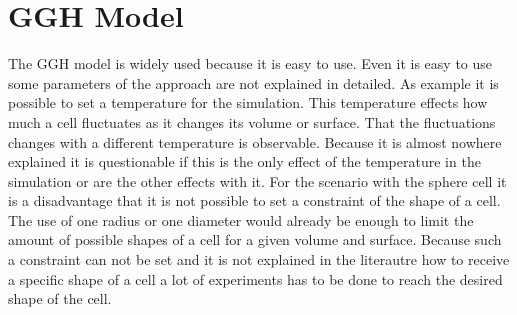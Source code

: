\section{GGH Model}
The \ac{GGH} model is widely used because it is easy to use. Even it is easy to use some parameters of the approach are not explained in detailed. As example it is possible to set a temperature for the simulation. This temperature effects how much a cell fluctuates as it changes its volume or surface. That the fluctuations changes with a different temperature is observable. Because it is almost nowhere explained it is questionable if this is the only effect of the temperature in the simulation or are the other effects with it. \newline
For the scenario with the sphere cell it is a disadvantage that it is not possible to set a constraint of the shape of a cell. The use of one radius or one diameter would already be enough to limit the amount of possible shapes of a cell for a given volume and surface. Because such a constraint can not be set and it is not explained in the literautre how to receive a specific shape of a cell a lot of experiments has to be done to reach the desired shape of the cell.